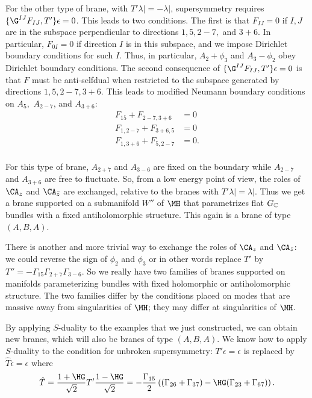 For the other type of brane, with $T'\lambda|=-\lambda|$,
supersymmetry requires $\{\G^{IJ}F_{IJ},T'\}\epsilon=0$.  This
leads to two conditions.  The first is that $F_{IJ}=0$ if $I,J$
are in the subspace perpendicular to directions $1,5,2-7,$ and
$3+6$.  In particular, $F_{0I}=0$ if direction $I$ is in this
subspace, and we impose Dirichlet boundary conditions for such
$I$. Thus, in particular, $A_2+\phi_3$ and $A_3-\phi_2$ obey
Dirichlet boundary conditions. The second consequence of
$\{\G^{IJ}F_{IJ},T'\}\epsilon=0$ is that $F$ must be anti-selfdual
when restricted to the subspace generated by directions
$1,5,2-7,3+6$. This leads to modified Neumann boundary conditions
on $A_5,$ $A_{2-7}$, and $A_{3+6}$: %
\setcounter{equation}{28}
\begin{equation}\label{eq:nono}
\begin{aligned}
F_{15}+F_{2-7,3+6}&=0\\ F_{1,2-7}+F_{3+6,5} & =0\\
F_{1,3+6}+F_{5,2-7}&=0.\\\end{aligned}
\end{equation}

For this type of brane, $A_{2+7}$ and $A_{3-6}$ are fixed on the
boundary while $A_{2-7}$ and $A_{3+6}$ are free to fluctuate.  So,
from a low energy point of view, the roles of $\CA_z$ and
$\CA_{\bar z}$ are exchanged, relative to the branes with
$T'\lambda|=\lambda|$.  Thus we get a brane supported on a
submanifold $W''$ of $\MH$ that parametrizes flat $G_{\Bbb{C}}$
bundles with a fixed antiholomorphic structure.  This again is a
brane of type $(A,B,A)$.

There is another and more trivial way to exchange the roles of
$\CA_z$ and $\CA_{\bar z}$: we could reverse the sign of $\phi_2$
and $\phi_3$ or in other words replace $T'$ by
$T''=-\Gamma_{15}\Gamma_{2+7}\Gamma_{3-6}$.  So we really have two
families of branes supported on manifolds parameterizing bundles
with fixed holomorphic or antiholomorphic structure.  The two
families differ by the conditions placed on modes that are massive
away from singularities of $\MH$; they may differ at singularities
of $\MH$.

\par{}

By applying $S$-duality to the examples that we just constructed,
we can obtain new branes, which will also be branes of type
$(A,B,A)$. We know how to apply $S$-duality to the condition for
unbroken supersymmetry: $T'\epsilon=\epsilon$ is replaced by $\hat
T\epsilon=\epsilon$ where %
\setcounter{equation}{29}
\begin{equation}\label{eq:nofo}
\hat T ={1+\HG\over \sqrt
2}T'{1-\HG\over \sqrt 2}=-{\Gamma_{15}\over
2}\left((\Gamma_{26}+\Gamma_{37})-\HG(\Gamma_{23}+\Gamma_{67})\right).
\end{equation}


